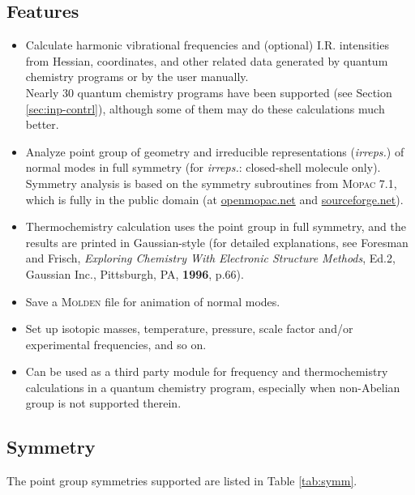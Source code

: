 \documentclass[12pt,english]{extarticle}
\begin{document}
\subsection{Features} \label{sec:feature}

\begin{itemize}
\item Calculate harmonic vibrational frequencies and (optional) I.R. intensities from Hessian, coordinates, and other related data generated by quantum chemistry programs or by the user manually. \\
    Nearly 30 quantum chemistry programs have been supported (see Section \ref{sec:inp-contrl}), although some of them may do these calculations much better.
\item Analyze point group of geometry and irreducible representations (\emph{irreps.}) of normal modes in full symmetry (for \emph{irreps.}: closed-shell molecule only). \\
    Symmetry analysis is based on the symmetry subroutines from \textsc{Mopac} 7.1, which is fully in the public domain (at \href{http://openmopac.net/Downloads/Downloads.html}{openmopac.net} and \href{https://sourceforge.net/projects/mopac7/}{sourceforge.net}).
\item Thermochemistry calculation uses the point group in full symmetry, and the results are printed in Gaussian-style (for detailed explanations, see Foresman and Frisch, \emph{Exploring Chemistry With Electronic Structure Methods}, Ed.2, Gaussian Inc., Pittsburgh, PA, \textbf{1996}, p.66).
\item Save a \textsc{Molden} file for animation of normal modes.
\item Set up isotopic masses, temperature, pressure, scale factor and/or experimental frequencies, and so on.
\item Can be used as a third party module for frequency and thermochemistry calculations in a quantum chemistry program, especially when non-Abelian group is not supported therein.
\end{itemize}

\subsection{Symmetry} \label{sec:symm}

The point group symmetries supported are listed in Table \ref{tab:symm}.
\end{document}
